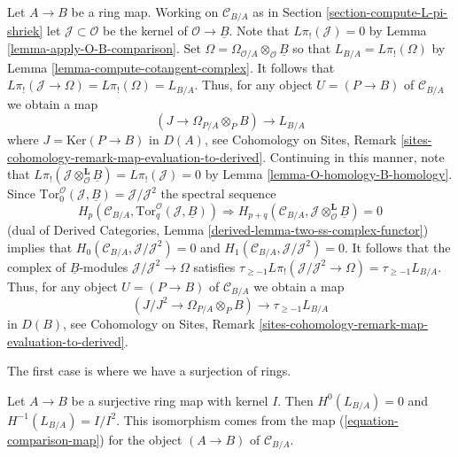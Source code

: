 \begin{remark}
\label{remark-make-map}
Let $A \to B$ be a ring map.  Working on $\mathcal{C}_{B/A}$ as in
Section \ref{section-compute-L-pi-shriek} let
$\mathcal{J} \subset \mathcal{O}$ be the kernel of
$\mathcal{O} \to \underline{B}$. Note that $L\pi_!(\mathcal{J}) = 0$ by
Lemma \ref{lemma-apply-O-B-comparison}. Set
$\Omega =  \Omega_{\mathcal{O}/A} \otimes_\mathcal{O} \underline{B}$
so that
$L_{B/A} = L\pi_!(\Omega)$ by Lemma \ref{lemma-compute-cotangent-complex}.
It follows that $L\pi_!(\mathcal{J} \to \Omega) = L\pi_!(\Omega) = L_{B/A}$.
Thus, for any object $U = (P \to B)$ of $\mathcal{C}_{B/A}$ we obtain a map
\begin{equation}
\label{equation-comparison-map-A}
(J \to \Omega_{P/A} \otimes_P B) \longrightarrow L_{B/A}
\end{equation}
where $J = \text{Ker}(P \to B)$ in $D(A)$, see
Cohomology on Sites, Remark
\ref{sites-cohomology-remark-map-evaluation-to-derived}.
Continuing in this manner, note that
$L\pi_!(\mathcal{J} \otimes_\mathcal{O}^\mathbf{L} \underline{B}) =
L\pi_!(\mathcal{J}) = 0$ by
Lemma \ref{lemma-O-homology-B-homology}.
Since $\text{Tor}_0^\mathcal{O}(\mathcal{J}, \underline{B}) =
\mathcal{J}/\mathcal{J}^2$
the spectral sequence
$$
H_p(\mathcal{C}_{B/A}, \text{Tor}_q^\mathcal{O}(\mathcal{J}, \underline{B}))
\Rightarrow 
H_{p + q}(\mathcal{C}_{B/A},
\mathcal{J} \otimes_\mathcal{O}^\mathbf{L} \underline{B}) = 0
$$
(dual of
Derived Categories, Lemma \ref{derived-lemma-two-ss-complex-functor})
implies that
$H_0(\mathcal{C}_{B/A}, \mathcal{J}/\mathcal{J}^2) = 0$
and $H_1(\mathcal{C}_{B/A}, \mathcal{J}/\mathcal{J}^2) = 0$.
It follows that the complex of $\underline{B}$-modules
$\mathcal{J}/\mathcal{J}^2 \to \Omega$ satisfies
$\tau_{\geq -1}L\pi_!(\mathcal{J}/\mathcal{J}^2 \to \Omega) =
\tau_{\geq -1}L_{B/A}$.
Thus, for any object $U = (P \to B)$ of $\mathcal{C}_{B/A}$ we obtain a map
\begin{equation}
\label{equation-comparison-map}
(J/J^2 \to \Omega_{P/A} \otimes_P B) \longrightarrow \tau_{\geq -1}L_{B/A}
\end{equation}
in $D(B)$, see
Cohomology on Sites, Remark
\ref{sites-cohomology-remark-map-evaluation-to-derived}.
\end{remark}

\noindent
The first case is where we have a surjection of rings.

\begin{lemma}
\label{lemma-surjection}
Let $A \to B$ be a surjective ring map with kernel $I$.
Then $H^0(L_{B/A}) = 0$ and $H^{-1}(L_{B/A}) = I/I^2$.
This isomorphism comes from the map (\ref{equation-comparison-map})
for the object $(A \to B)$ of $\mathcal{C}_{B/A}$.
\end{lemma}

